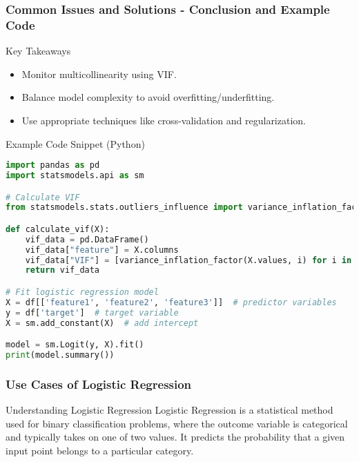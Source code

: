 \documentclass[aspectratio=169]{beamer}
\begin{document}
\begin{frame}[fragile]
    \frametitle{Common Issues and Solutions - Conclusion and Example Code}
    \begin{block}{Key Takeaways}
        \begin{itemize}
            \item Monitor multicollinearity using VIF.
            \item Balance model complexity to avoid overfitting/underfitting.
            \item Use appropriate techniques like cross-validation and regularization.
        \end{itemize}
    \end{block}
    
    \begin{block}{Example Code Snippet (Python)}
        \begin{lstlisting}[language=Python]
import pandas as pd
import statsmodels.api as sm

# Calculate VIF
from statsmodels.stats.outliers_influence import variance_inflation_factor

def calculate_vif(X):
    vif_data = pd.DataFrame()
    vif_data["feature"] = X.columns
    vif_data["VIF"] = [variance_inflation_factor(X.values, i) for i in range(X.shape[1])]
    return vif_data

# Fit logistic regression model
X = df[['feature1', 'feature2', 'feature3']]  # predictor variables
y = df['target']  # target variable
X = sm.add_constant(X)  # add intercept

model = sm.Logit(y, X).fit()
print(model.summary())
        \end{lstlisting}
    \end{block}
\end{frame}

\begin{frame}[fragile]
    \frametitle{Use Cases of Logistic Regression}
    \begin{block}{Understanding Logistic Regression}
        Logistic Regression is a statistical method used for binary classification problems, where the outcome variable is categorical and typically takes on one of two values. It predicts the probability that a given input point belongs to a particular category.
    \end{block}
\end{frame}
\end{document}
